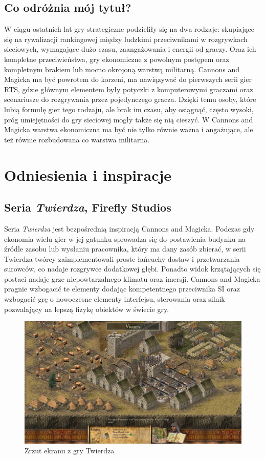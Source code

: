 \documentclass[a4paper]{scrreprt}
\def \GameTiTle{Cannons and Magicka}
\begin{document}
\section{Co odróżnia mój tytuł?}
W ciągu ostatnich lat gry strategiczne podzieliły się na dwa rodzaje: skupiające się na rywalizacji rankingowej między ludzkimi przeciwnikami w rozgrywkach sieciowych, wymagające dużo czasu, zaangażowania i energii od graczy. Oraz ich kompletne przeciwieństwa, gry ekonomiczne z powolnym postępem oraz kompletnym brakiem lub mocno okrojoną warstwą militarną.
\GameTiTle{} ma być powrotem do korzeni, ma nawiązywać do pierwszych serii gier RTS, gdzie głównym elementem były potyczki z komputerowymi graczami oraz scenariusze do rozgrywania przez pojedynczego gracza. Dzięki temu osoby, które lubią formułę gier tego rodzaju, ale brak im czasu, aby osiągnąć, często wysoki, próg umiejętności do gry sieciowej mogły także się nią cieszyć. 
W \GameTiTle{} warstwa ekonomiczna ma być nie tylko równie ważna i angażujące, ale też równie rozbudowana co warstwa militarna.


\chapter{Odniesienia i inspiracje} 

\section{Seria \emph{Twierdza}, Firefly Studios}
Seria \emph{Twierdza} jest bezpośrednią 
inspiracją \GameTiTle{}. Podczas gdy ekonomia wielu gier w jej gatunku sprowadza się do postawienia budynku na źródle zasobu lub wysłaniu pracownika, który ma dany zasób zbierać, w serii Twierdza twórcy zaimplementowali proste łańcuchy dostaw i przetwarzania surowców, co nadaje rozgrywce dodatkowej głębi. Ponadto widok krzątających się postaci nadaje grze niepowtarzalnego klimatu oraz imersji. \GameTiTle{} pragnie wzbogacić te elementy dodając kompetentnego przeciwnika SI oraz wzbogacić grę o nowoczesne elementy interfejsu, sterowania oraz silnik pozwalający na lepszą fizykę obiektów w świecie gry.

\begin{figure}[hb]
\centering
\includegraphics[width=1\textwidth]{stronghold2.jpg}
\caption{\label{} Zrzut ekranu z gry Twierdza}
\end{figure}
\newpage
\end{document}
